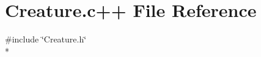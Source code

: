 \hypertarget{Creature_8c_09_09}{\section{Creature.\-c++ File Reference}
\label{Creature_8c_09_09}
}
{\ttfamily \#include \char`\"{}Creature.\-h\char`\"{}}\\*
